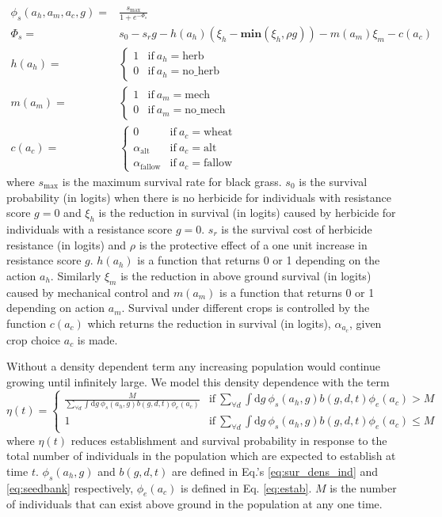 \documentclass[12pt, a4paper]{article}
\begin{document}
\begin{align}\label{eq:sur_dens_ind}
	\phi_s(a_h, a_m, a_c, g) =& \frac{s_\text{max}}{1 + e^{-\Phi_s}}\\
	\Phi_s =& s_0 - s_rg - h(a_h)\left(\xi_h - \textbf{min}(\xi_h, \rho g) \right) - m(a_m)\xi_m - c(a_c)\\
	h(a_h) =& \begin{cases}
		1 &\text{if}~a_h = \text{herb}\\
		0 &\text{if}~a_h = \text{no\_herb}
	\end{cases}\\
	m(a_m) =& \begin{cases}
		1 &\text{if}~a_m = \text{mech}\\
		0 &\text{if}~a_m = \text{no\_mech}
	\end{cases}\\
	c(a_c) =& \begin{cases}
		0 &\text{if}~a_c = \text{wheat}\\
		\alpha_\text{alt} &\text{if}~a_c = \text{alt}\\
		\alpha_\text{fallow} &\text{if}~a_c = \text{fallow}
	\end{cases} 
\end{align}
where $s_\text{max}$ is the maximum survival rate for black grass. $s_0$ is the survival probability (in logits) when there is no herbicide for individuals with resistance score $g = 0$ and $\xi_h$ is the reduction in survival (in logits) caused by herbicide for individuals with a resistance score $g = 0$. $s_r$ is the survival cost of herbicide resistance (in logits) and $\rho$ is the protective effect of a one unit increase in resistance score $g$. $h(a_h)$ is a function that returns 0 or 1 depending on the action $a_h$. Similarly $\xi_m$ is the reduction in above ground survival (in logits) caused by mechanical control and $m(a_m)$ is a function that returns 0 or 1 depending on action $a_m$. Survival under different crops is controlled by the function $c(a_c)$ which returns the reduction in survival (in logits), $\alpha_{a_c}$, given crop choice $a_c$ is made.  

Without a density dependent term any increasing population would continue growing until infinitely large. We model this density dependence with the term 
\begin{equation}\label{eq:density_dependence}
	\eta(t) =
		\begin{cases}
			\frac{M}{\sum_{\forall d}\int \text{d}g~ \phi_s(a_h, g)b(g, d, t)\phi_e(a_c)} &\text{if}~ \sum_{\forall d}\int \text{d}g~ \phi_s(a_h, g)b(g, d, t)\phi_e(a_c) > M \\
			1 &\text{if}~ \sum_{\forall d}\int \text{d}g~ \phi_s(a_h, g)b(g, d, t)\phi_e(a_c) \leq M  
		\end{cases}
\end{equation}
where $\eta(t)$ reduces establishment and survival probability in response to the total number of individuals in the population which are expected to establish at time $t$. $\phi_s(a_h, g)$ and $b(g, d, t)$ are defined in Eq.'s \ref{eq:sur_dens_ind} and \ref{eq:seedbank} respectively, $\phi_e(a_c)$ is defined in Eq. \ref{eq:estab}. $M$ is the number of individuals that can exist above ground in the population at any one time. 
\end{document}
